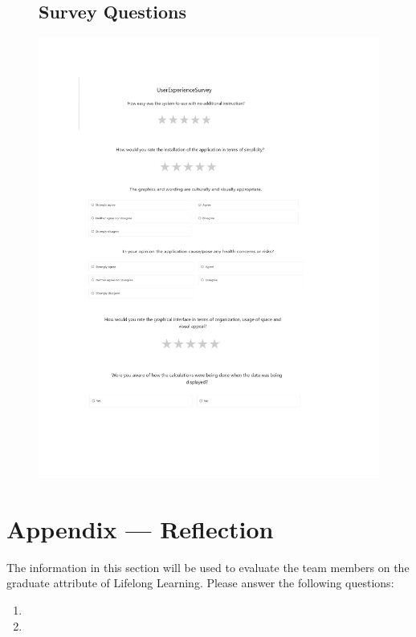 \documentclass[12pt, titlepage]{article}
\begin{document}
\begin{figure}
  \subsection{Survey Questions}
  \centering
  \includegraphics[width=1\textwidth]{UserExperienceSurvey.pdf}
\end{figure}


\newpage{}
\section*{Appendix --- Reflection}

The information in this section will be used to evaluate the team members on the
graduate attribute of Lifelong Learning.  Please answer the following questions:

\begin{enumerate}
  \item 
  \item 
\end{enumerate}
\end{document}
